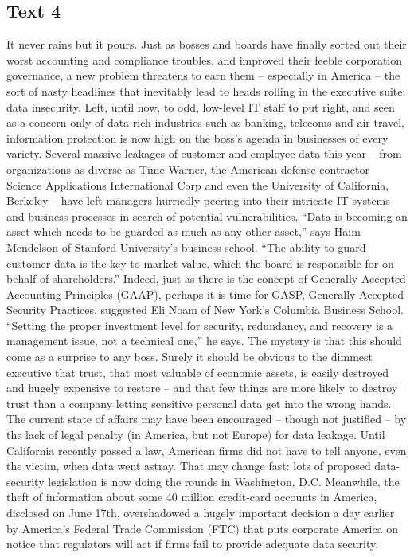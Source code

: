 \subsection{Text 4}
It never rains but it pours. Just as bosses and boards have finally sorted out their worst accounting and compliance troubles, and improved their feeble corporation governance, a new problem threatens to earn them – especially in America – the sort of nasty headlines that inevitably lead to heads rolling in the executive suite: data insecurity. Left, until now, to odd, low-level IT staff to put right, and seen as a concern only of data-rich industries such as banking, telecoms and air travel, information protection is now high on the boss’s agenda in businesses of every variety.
Several massive leakages of customer and employee data this year – from organizations as diverse as Time Warner, the American defense contractor Science Applications International Corp and even the University of California, Berkeley – have left managers hurriedly peering into their intricate IT systems and business processes in search of potential vulnerabilities.
“Data is becoming an asset which needs to be guarded as much as any other asset,” says Haim Mendelson of Stanford University’s business school. “The ability to guard customer data is the key to market value, which the board is responsible for on behalf of shareholders.” Indeed, just as there is the concept of Generally Accepted Accounting Principles (GAAP), perhaps it is time for GASP, Generally Accepted Security Practices, suggested Eli Noam of New York’s Columbia Business School. “Setting the proper investment level for security, redundancy, and recovery is a management issue, not a technical one,” he says.
The mystery is that this should come as a surprise to any boss. Surely it should be obvious to the dimmest executive that trust, that most valuable of economic assets, is easily destroyed and hugely expensive to restore – and that few things are more likely to destroy trust than a company letting sensitive personal data get into the wrong hands.
The current state of affairs may have been encouraged – though not justified – by the lack of legal penalty (in America, but not Europe) for data leakage. Until California recently passed a law, American firms did not have to tell anyone, even the victim, when data went astray. That may change fast: lots of proposed data-security legislation is now doing the rounds in Washington, D.C. Meanwhile, the theft of information about some 40 million credit-card accounts in America, disclosed on June 17th, overshadowed a hugely important decision a day earlier by America’s Federal Trade Commission (FTC) that puts corporate America on notice that regulators will act if firms fail to provide adequate data security.
